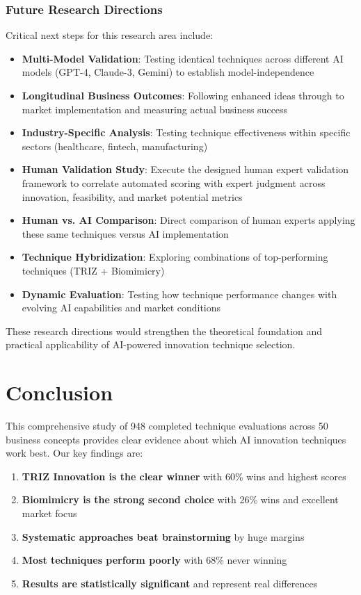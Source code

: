 \documentclass[12pt]{article}
\begin{document}
\subsubsection{Future Research Directions}

Critical next steps for this research area include:

\begin{itemize}
\item \textbf{Multi-Model Validation}: Testing identical techniques across different AI models (GPT-4, Claude-3, Gemini) to establish model-independence
\item \textbf{Longitudinal Business Outcomes}: Following enhanced ideas through to market implementation and measuring actual business success
\item \textbf{Industry-Specific Analysis}: Testing technique effectiveness within specific sectors (healthcare, fintech, manufacturing)
\item \textbf{Human Validation Study}: Execute the designed human expert validation framework to correlate automated scoring with expert judgment across innovation, feasibility, and market potential metrics
\item \textbf{Human vs. AI Comparison}: Direct comparison of human experts applying these same techniques versus AI implementation
\item \textbf{Technique Hybridization}: Exploring combinations of top-performing techniques (TRIZ + Biomimicry)
\item \textbf{Dynamic Evaluation}: Testing how technique performance changes with evolving AI capabilities and market conditions
\end{itemize}

These research directions would strengthen the theoretical foundation and practical applicability of AI-powered innovation technique selection.

\section{Conclusion}

This comprehensive study of 948 completed technique evaluations across 50 business concepts provides clear evidence about which AI innovation techniques work best. Our key findings are:

\begin{enumerate}
\item \textbf{TRIZ Innovation is the clear winner} with 60\% wins and highest scores
\item \textbf{Biomimicry is the strong second choice} with 26\% wins and excellent market focus
\item \textbf{Systematic approaches beat brainstorming} by huge margins
\item \textbf{Most techniques perform poorly} with 68\% never winning
\item \textbf{Results are statistically significant} and represent real differences
\end{enumerate}
\end{document}
